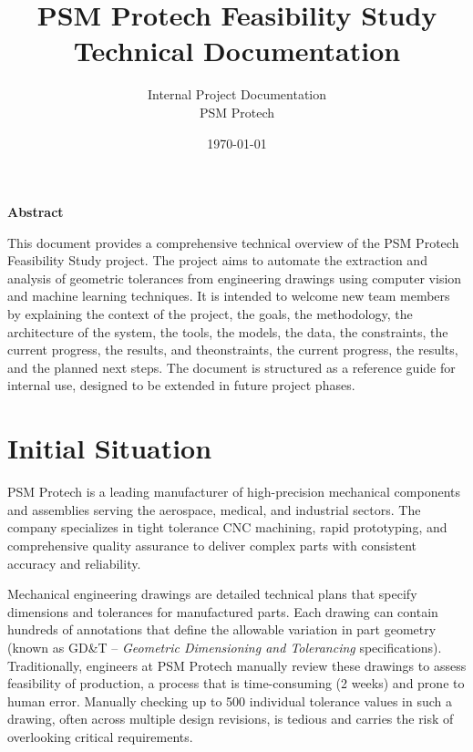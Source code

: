 \documentclass[11pt,a4paper]{article}
\title{\textbf{PSM Protech Feasibility Study}\\Technical Documentation}
\author{Internal Project Documentation \\ PSM Protech}
\date{\today}
\begin{document}
\maketitle
\thispagestyle{empty}
\begin{center}
\newpage
\textbf{Abstract}
\end{center}
\noindent
This document provides a comprehensive technical overview of the PSM Protech Feasibility Study project. The project aims to automate the extraction and analysis of geometric tolerances from engineering drawings using computer vision and machine learning techniques. It is intended to welcome new team members by explaining the context of the project, the goals, the methodology, the architecture of the system, the tools, the models, the data, the constraints, the current progress, the results, and theonstraints, the current progress, the results, and the planned next steps. The document is structured as a reference guide for internal use, designed to be extended in future project phases.

\vfill
\newpage
\tableofcontents
\newpage

\section{Initial Situation}
PSM Protech is a leading manufacturer of high-precision mechanical components and assemblies serving the aerospace, medical, and industrial sectors. The company specializes in tight tolerance CNC machining, rapid prototyping, and comprehensive quality assurance to deliver complex parts with consistent accuracy and reliability.

Mechanical engineering drawings are detailed technical plans that specify dimensions and tolerances for manufactured parts. Each drawing can contain hundreds of annotations that define the allowable variation in part geometry (known as GD\&T -- \emph{Geometric Dimensioning and Tolerancing} specifications). Traditionally, engineers at PSM Protech manually review these drawings to assess feasibility of production, a process that is time-consuming (2 weeks) and prone to human error.  Manually checking up to 500 individual tolerance values in such a drawing, often across multiple design revisions, is tedious and carries the risk of overlooking critical requirements.
\end{document}
